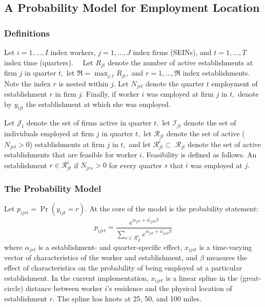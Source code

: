 \subsection{A Probability Model for Employment Location}

\subsubsection{Definitions}

Let $i=1,...,I$ index workers, $j=1,...,J$ index firms (SEINs), and $%
t=1,...,T$ index time (quarters). \ \ Let $R_{jt}$ denote the number of
active establishments at firm $j$ in quarter $t,$ let $\mathfrak{R}%
=\max_{j,t}R_{jt},$ and $r=1,...,\mathfrak{R}$ index establishments. Note
the index $r$ is nested within $j.$ Let $N_{jrt}$ denote the quarter $t$
employment of establishment $r$ in firm $j.$ Finally, if worker $i$ was
employed at firm $j$ in $t,$ denote by $y_{ijt}$ the establishment at which
she was employed$.$

Let $\mathcal{J}_{t}$ denote the set of firms active in quarter $t,$ let $%
\mathcal{I}_{jt}$ denote the set of individuals employed at firm $j$ in
quarter $t,$ let $\mathcal{R}_{jt}$ denote the set of active ($N_{jrt}>0$)
establishments at firm $j$ in $t,$ and let $\mathcal{R}_{jt}^{i}\subset $ $%
\mathcal{R}_{jt}$ denote the set of active establishments that are feasible
for worker $i$. Feasibility is defined as follows. An establishment $r\in 
\mathcal{R}_{jt}^{i}$ if $N_{jrs}>0$ for every quarter $s$ that $i$ was
employed at $j.$

\subsubsection{The Probability Model}

Let $p_{ijrt}=\Pr \left( y_{ijt}=r\right)$. At the core of the model is the
probability statement:%
%
\begin{equation}
p_{ijrt}=\frac{e^{\alpha _{jrt}+x_{ijrt}^{\prime }\beta }}{\sum_{s\in 
\mathcal{R}_{jt}^{i}}e^{\alpha _{jst}+x_{ijst}^{\prime }\beta }}
\label{u2w:p}
\end{equation}%
%
where $\alpha _{jrt}$ is a establishment- and quarter-specific effect, $%
x_{ijrt}$ is a time-varying vector of characteristics of the worker and
establishment, and $\beta $ measures the effect of characteristics on the
probability of being employed at a particular establishment. In the current
implementation, $x_{ijrt}$ is a linear spline in the (great-circle) distance
between worker $i$'s residence and the physical location of establishment $%
r. $ The spline has knots at 25, 50, and 100 miles.

